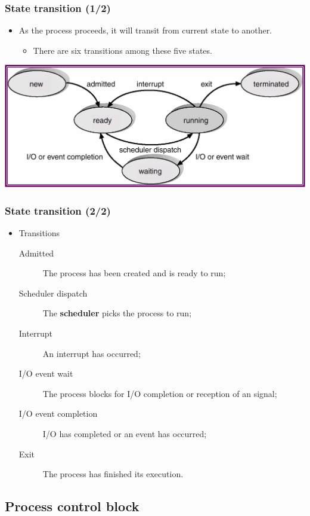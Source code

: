 \documentclass[CJKutf8,xcolor=pdftex,dvipsnames,table]{beamer}
\begin{document}
\begin{CJK*}{UTF8}{song}
  \begin{frame}
  \frametitle{State transition (1/2)} \pause
  \begin{itemize}
  \item{As the process proceeds, it will transit from current state to another.}
    \begin{itemize}
    \item{There are six transitions among these five states.} \pause
    \end{itemize}
  \end{itemize}
  \begin{center}
    \includegraphics[scale=0.5]{v6f4-1}
  \end{center}
  \end{frame}

  \begin{frame}
  \frametitle{State transition (2/2)} \pause
  \begin{itemize}
  \item{Transitions} \pause
    \begin{description}
    \item[Admitted]{The process has been created and is ready to run;} \pause
    \item[Scheduler dispatch]{The \textbf{scheduler} picks the process to run;} \pause
    \item[Interrupt]{An interrupt has occurred;} \pause
    \item[I/O event wait]{The process blocks for I/O completion or reception of an signal;} \pause
    \item[I/O event completion]{I/O has completed or an event has occurred;} \pause
    \item[Exit]{The process has finished its execution.}
    \end{description}
  \end{itemize}
  \end{frame}

  \subsection{Process control block}


\end{CJK*}
\end{document}
